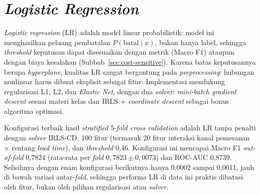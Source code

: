 \section{\textit{Logistic Regression}}
\label{sec:lr}

\textit{Logistic regression} (LR) adalah model linear probabilistik: model ini menghasilkan peluang pembatalan $P(\text{batal} \mid x)$, bukan hanya label, sehingga \textit{threshold} keputusan dapat disesuaikan dengan metrik (Macro F1) ataupun dengan biaya kesalahan (Subbab~\ref{sec:cost-sensitive}). Karena batas keputusannya berupa \textit{hyperplane}, kualitas LR sangat bergantung pada \textit{preprocessing}: hubungan nonlinear harus dibuat eksplisit sebagai fitur. 
Implementasi mendukung regularisasi L1, L2, dan \textit{Elastic Net}, dengan dua \textit{solver}: \textit{mini-batch gradient descent} sesuai materi kelas \cite{khodra-lr-sga} dan IRLS + \textit{coordinate descent} \cite{friedman2010glmnet} sebagai bonus algoritma optimasi.

Konfigurasi terbaik hasil \textit{stratified} 5-\textit{fold cross validation} adalah LR tanpa penalti dengan \textit{solver} IRLS-CD, 100 fitur (termasuk 20 fitur interaksi kanal pemesanan $\times$ rentang \textit{lead time}), dan \textit{threshold} 0,46. Konfigurasi ini mencapai Macro F1 \textit{out-of-fold} 0,7824 (rata-rata per \textit{fold} $0{,}7823 \pm 0{,}0073$) dan ROC-AUC 0,8739. Selisihnya dengan enam konfigurasi berikutnya hanya 0,0002 sampai 0,0011, jauh di bawah variasi antar-\textit{fold}, sehingga performa LR di data ini praktis dibatasi oleh fitur, bukan oleh pilihan regularisasi atau \textit{solver}.






